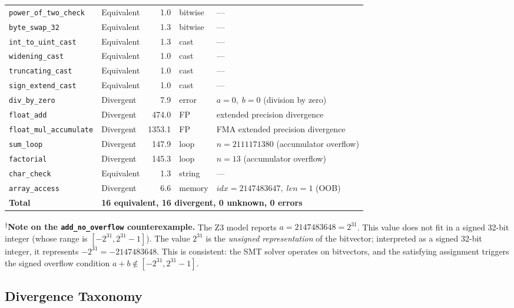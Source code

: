 \documentclass[11pt]{article}
\begin{document}
\begin{table}[H]
\begin{tabular}{@{}llrlp{5.5cm}@{}}
\texttt{power\_of\_two\_check} & Equivalent & 1.0 & bitwise & --- \\
\texttt{byte\_swap\_32} & Equivalent & 1.3 & bitwise & --- \\
\texttt{int\_to\_uint\_cast} & Equivalent & 1.3 & cast & --- \\
\texttt{widening\_cast} & Equivalent & 1.0 & cast & --- \\
\texttt{truncating\_cast} & Equivalent & 1.0 & cast & --- \\
\texttt{sign\_extend\_cast} & Equivalent & 1.0 & cast & --- \\
\texttt{div\_by\_zero} & Divergent & 7.9 & error & $a = 0,\; b = 0$ (division by zero) \\
\texttt{float\_add} & Divergent & 474.0 & FP & extended precision divergence \\
\texttt{float\_mul\_accumulate} & Divergent & 1353.1 & FP & FMA extended precision divergence \\
\texttt{sum\_loop} & Divergent & 147.9 & loop & $n = 2111171380$ (accumulator overflow) \\
\texttt{factorial} & Divergent & 145.3 & loop & $n = 13$ (accumulator overflow) \\
\texttt{char\_check} & Equivalent & 1.3 & string & --- \\
\texttt{array\_access} & Divergent & 6.6 & memory & $\mathit{idx} = 2147483647,\; \mathit{len} = 1$ (OOB) \\
\midrule
\textbf{Total} & \multicolumn{4}{l}{\textbf{16 equivalent, 16 divergent, 0 unknown, 0 errors}} \\
\bottomrule
\end{tabular}
\end{table}

\textsuperscript{$\dagger$}\textbf{Note on the \texttt{add\_no\_overflow} counterexample.}
The Z3 model reports $a = 2147483648 = 2^{31}$. This value does not fit in a signed 32-bit integer (whose range is $[-2^{31}, 2^{31}-1]$). The value $2^{31}$ is the \emph{unsigned representation} of the bitvector; interpreted as a signed 32-bit integer, it represents $-2^{31} = -2147483648$. This is consistent: the SMT solver operates on bitvectors, and the satisfying assignment triggers the signed overflow condition $a + b \notin [-2^{31}, 2^{31}-1]$.


\subsection{Divergence Taxonomy}
\label{sec:eval-taxonomy}
\end{document}
